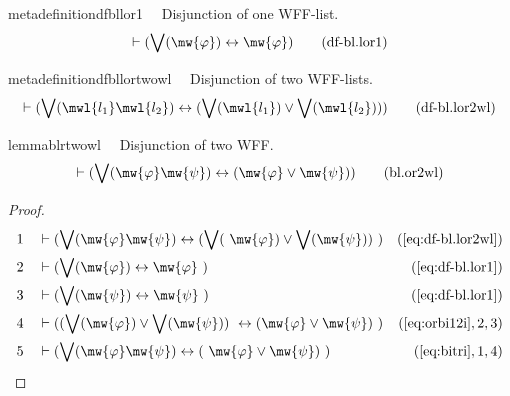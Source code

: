 \begin{restatable}{metadefinition}{dfbllor1}~~ Disjunction of one WFF-list.
\begin{align}
\vdash ( \bigvee( \mw{\varphi} ) \leftrightarrow \mw{\varphi}
    )\label{eq:df-bl.lor1}\tag{df-bl.lor1}
\end{align}
\end{restatable}

\begin{restatable}{metadefinition}{dfbllortwowl}~~ Disjunction of two WFF-lists.
\begin{align}
\vdash ( \bigvee( \mwl{l_1} \mwl{l_2} ) \leftrightarrow ( \bigvee( \mwl{l_1} )
    \vee \bigvee( \mwl{l_2} ) ) )\label{eq:df-bl.lor2wl}\tag{df-bl.lor2wl}
\end{align}
\end{restatable}

\begin{restatable}{lemma}{blrtwowl}~~ Disjunction of two WFF.
\begin{align}
\vdash ( \bigvee( \mw{\varphi} \mw{\psi} ) \leftrightarrow ( \mw{\varphi} \vee
    \mw{\psi} ) )\label{eq:bl.or2wl}\tag{bl.or2wl}
\end{align}
\end{restatable}

\begin{proof}
\begin{align}
  1 &&  & \vdash ( \bigvee( \mw{\varphi} \mw{\psi} ) \leftrightarrow ( \bigvee(
     ~\mw{\varphi} ) \vee \bigvee( \mw{\psi} ) )
     ~)&(\mbox{\ref{eq:df-bl.lor2wl}})\notag
  \\ 2 &&  & \vdash ( \bigvee( \mw{\varphi} ) \leftrightarrow \mw{\varphi}
     ~)&(\mbox{\ref{eq:df-bl.lor1}})\notag
  \\ 3 &&  & \vdash ( \bigvee( \mw{\psi} ) \leftrightarrow \mw{\psi}
     ~)&(\mbox{\ref{eq:df-bl.lor1}})\notag
  \\ 4 &&  & \vdash ( ( \bigvee( \mw{\varphi} ) \vee \bigvee( \mw{\psi} ) )
     ~\leftrightarrow ( \mw{\varphi} \vee \mw{\psi} )
     ~)&(\mbox{\ref{eq:orbi12i}},2,3)\notag
  \\ 5 &&  & \vdash ( \bigvee( \mw{\varphi} \mw{\psi} ) \leftrightarrow (
     ~\mw{\varphi} \vee \mw{\psi} )
     ~)&(\mbox{\ref{eq:bitri}},1,4)\notag
\end{align}
\end{proof}

